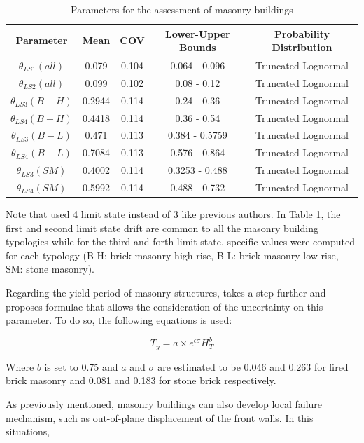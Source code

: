 \begin{table}[ht]
\caption{Parameters for the assessment of masonry buildings}
\centering
\begin{tabular}[ht]{ccccc}
Parameter & Mean & COV & Lower-Upper Bounds & Probability Distribution \\[0.5ex]\hline
$\theta_{LS1}(all)$	&	0.079	&	0.104	&	0.064	-	0.096	&	Truncated	Lognormal \\
$\theta_{LS2}(all)$	&	0.099	&	0.102	&	0.08	-	0.12	&	Truncated	Lognormal\\
$\theta_{LS3}(B-H)$	&	0.2944	&	0.114	&	0.24	-	0.36	&	Truncated	Lognormal\\
$\theta_{LS4}(B-H)$	&	0.4418	&	0.114	&	0.36	-	0.54	&	Truncated	Lognormal\\
$\theta_{LS3}(B-L)$	&	0.471	&	0.113	&	0.384	-	0.5759	&	Truncated	Lognormal\\
$\theta_{LS4}(B-L)$	&	0.7084	&	0.113	&	0.576	-	0.864	&	Truncated	Lognormal\\
$\theta_{LS3}(SM)$	&	0.4002	&	0.114	&	0.3253	-	0.488	&	Truncated	Lognormal\\
$\theta_{LS4}(SM)$	&	0.5992	&	0.114	&	0.488	-	0.732	&	Truncated	Lognormal\\
\end{tabular}
\label{table:MansoryParameters}
\end{table}

Note that \citep{Ahmadetal2011} used 4 limit state instead of 3 like previous authors. In Table \ref{table:MansoryParameters}, the first and second limit state drift are common to all the masonry building typologies while for the third and forth limit state, specific values were computed for each typology (B-H: brick masonry high rise, B-L: brick masonry low rise, SM: stone masonry).

Regarding the yield period of masonry structures, \citep{Ahmadetal2011} takes a step further and proposes formulae that allows the consideration of the uncertainty on this parameter. To do so, the following equations is used:

\begin{equation}
T_y=a\times e^{\epsilon \sigma}H_T^b
\end{equation}

Where $b$ is set to 0.75 and $a$ and $\sigma$ are estimated to be 0.046 and 0.263 for fired brick masonry and 0.081 and 0.183 for stone brick respectively.
\hfil\ \

As previously mentioned, masonry buildings can also develop local failure mechanism, such as out-of-plane displacement of the front walls. In this situations, 








